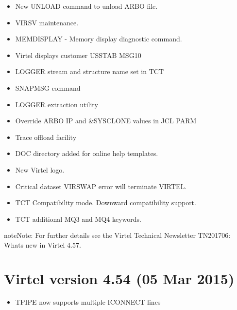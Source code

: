 \documentclass[letterpaper,10pt,english]{sphinxmanual}
\begin{document}
\begin{itemize}
\item {} 
New UNLOAD command to unload ARBO file.

\item {} 
VIRSV maintenance.

\item {} 
MEMDISPLAY - Memory display diagnostic command.

\item {} 
Virtel displays customer USSTAB MSG10

\item {} 
LOGGER stream and structure name set in TCT

\item {} 
SNAPMSG command

\item {} 
LOGGER extraction utility

\item {} 
Override ARBO IP and \&SYSCLONE values in JCL PARM

\item {} 
Trace offload facility

\item {} 
DOC directory added for online help templates.

\item {} 
New Virtel logo.

\item {} 
Critical dataset VIRSWAP error will terminate VIRTEL.

\item {} 
TCT Compatibility mode. Downward compatibility support.

\end{itemize}

\begin{itemize}
\item {} 
TCT additional MQ3 and MQ4 keywords.

\end{itemize}

\begin{sphinxadmonition}{note}{Note:}
For further details see the Virtel Technical Newsletter TN201706: Whats new in Virtel 4.57.
\end{sphinxadmonition}


\section{Virtel version 4.54 (05 Mar 2015)}
\label{\detokenize{Installation_Guide:virtel-version-4-54-05-mar-2015}}
\begin{itemize}
\item {} 
TPIPE now supports multiple ICONNECT lines

\end{itemize}
\end{document}
